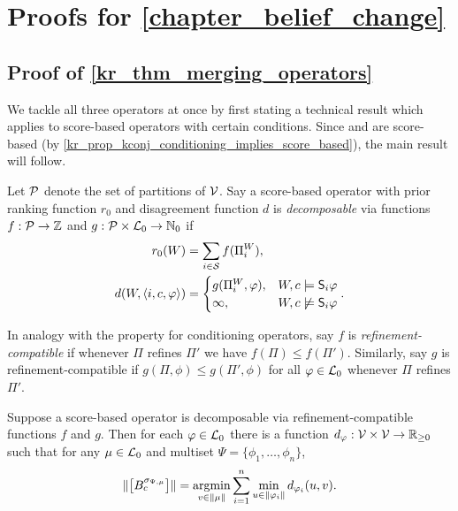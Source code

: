 \chapter{Proofs for \cref{chapter_belief_change}}

\section{Proof of \cref{kr_thm_merging_operators}}
\label{kr_app_sec_thm_merging_operators}

We tackle all three operators at once by first stating a technical result which
applies to score-based operators with certain conditions. Since \varbasedcond{}
and \partbasedcond{} are score-based (by
\cref{kr_prop_kconj_conditioning_implies_score_based}), the main result will
follow.

Let $\mathcal{P}$ denote the set of partitions of $\mathcal{V}$. Say a score-based
operator with prior ranking function $r_0$ and disagreement function $d$ is
\emph{decomposable} via functions $f: \mathcal{P} \to \mathbb{Z}$ and $g: \mathcal{P}
\times \mathcal{L}{}_0 \to \mathbb{N}_0$ if
\begin{align*}
    r_0(W) &= \sum_{i \in \mathcal{S}}{f(\Pi^W_i)}, \\
    d(W, \langle {i, c, \varphi} \rangle) &= \begin{cases}
        g(\Pi^W_i, \varphi),& W, c \models \mathsf{S}_i\varphi \\
        \infty,& W, c \not\models \mathsf{S}_i\varphi
    \end{cases}.
\end{align*}

In analogy with the  property for conditioning operators, say $f$
is \emph{refinement-compatible} if whenever $\Pi$ refines $\Pi'$ we have
$f(\Pi) \le f(\Pi')$. Similarly, say $g$ is refinement-compatible if $g(\Pi,
\phi) \le g(\Pi', \phi)$ for all $\varphi \in \mathcal{L}{}_0$ whenever $\Pi$ refines
$\Pi'$.

\begin{lemma}
    \label{kr_app_lemma_score_based_merging}
    Suppose a score-based operator is decomposable via refinement-compatible
    functions $f$ and $g$. Then for each $\varphi \in \mathcal{L}{}_0$ there is a function
    $d_\varphi: \mathcal{V} \times \mathcal{V} \to \mathbb{R}_{\ge 0}$ such that
    for any $\mu \in \mathcal{L}{}_0$ and multiset
    $\Psi = \{\phi_1, \ldots, \phi_n\}$,
    \begin{equation}
        \label{kr_app_eqn_merging}
        \propmods{\proppart{B^{\sigma_{\Psi, \mu}}_c}}
        =
        \argmin_{v \in \propmods{\mu}}{
            \sum_{i=1}^{n}{
                \min_{u \in \propmods{\phi_i}}{
                    d_{\phi_i}(u, v)
                }
            }
        }.
    \end{equation}
\end{lemma}

